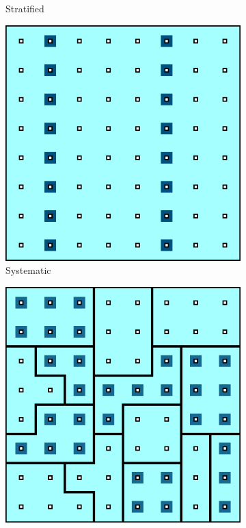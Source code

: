 \begin{figure}[t]
\begin{subfigure}[b]{0.30\textwidth}
\caption{\small Stratified} 
\label{fig:StS}
\end{subfigure}\quad
\begin{subfigure}[b]{0.30\textwidth}
\includegraphics[width=\textwidth]{images/DC/Sampling_SyS.png}
\caption{\small Systematic} 
\label{fig:SyS}
\end{subfigure}
\begin{subfigure}[b]{0.30\textwidth}
\includegraphics[width=\textwidth]{images/DC/Sampling_ClS.png}

\end{subfigure}
\end{figure}
